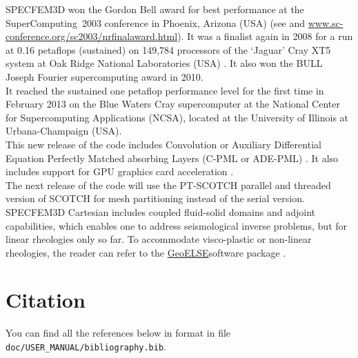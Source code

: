 SPECFEM3D won the Gordon Bell award for best performance at the SuperComputing~2003
conference in Phoenix, Arizona (USA) (see \citet{KoTsChTr03} and
\url{www.sc-conference.org/sc2003/nrfinalaward.html}). It was a finalist
again in 2008 for a run at 0.16 petaflops (sustained) on 149,784 processors
of the `Jaguar' Cray XT5 system at Oak Ridge National Laboratories
(USA) \citep{CaKoLaTiMiLeSnTr08}. It also won the BULL Joseph Fourier
supercomputing award in 2010.\\

It reached the sustained one petaflop performance level for the first time in February 2013
on the Blue Waters Cray supercomputer at the National Center for Supercomputing Applications (NCSA), located at the University of Illinois at Urbana-Champaign (USA).\\


This new release of the code includes Convolution or
Auxiliary Differential Equation Perfectly Matched absorbing Layers
(C-PML or ADE-PML) \citep{MaKoEz08,MaKoGe08,MaKo09,MaKoGeBr10,KoMa07}.
It also includes support for GPU graphics card acceleration \citep{Kom11,MiKo10,KoMiEr09,KoErGoMi10}.\\


The next release of the code will use the PT-SCOTCH parallel and threaded
version of SCOTCH for mesh partitioning instead of the serial version.\\


SPECFEM3D Cartesian includes coupled fluid-solid domains and adjoint
capabilities, which enables one to address seismological inverse problems,
but for linear rheologies only so far. To accommodate visco-plastic
or non-linear rheologies, the reader can refer to the \href{http://geoelse.stru.polimi.it/}{GeoELSE}software
package \citep{CaGa97,StPaIg09}.


\section{Citation}

You can find all the references below in \BibTeX format in file \texttt{doc/USER\_MANUAL/bibliography.bib}.\\


